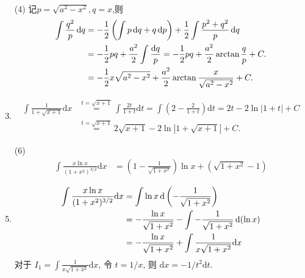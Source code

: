 \begin{solution}
\begin{enumerate}
\begin{align*}
              \end{align*}
        \item[(4)] 记$p = \sqrt{a^2 - x^2}, q = x$,则
            \begin{align*}
                \int \frac{q^2}{p} \operatorname{d\!} q & = -\frac{1}{2} \left( \int p \operatorname{d\!} q + q \operatorname{d\!} p \right) + \frac{1}{2} \int \frac{p^2 + q^2}{p} \operatorname{d\!} q               \\
                                          & = -\frac{1}{2} pq + \frac{a^2}{2} \int \frac{\operatorname{d\!} q}{p} = -\frac{1}{2} pq + \frac{a^2}{2} \arctan \frac{q}{p} + C. \\
                                          & = -\frac{1}{2} x \sqrt{a^2 - x^2} + \frac{a^2}{2} \arctan \frac{x}{\sqrt{a^2 - x^2}} + C.
            \end{align*}
        \item \begin{align*}
                  \int \frac{1}{1 + \sqrt{x+ 1} } \mathrm{d}x & \overset{t = \sqrt{x+1}}{=} \int \frac{2t}{1+t} \mathrm{d}t = \int \left(2 - \frac{2}{1+t}\right) \mathrm{d}t = 2t - 2 \ln |1+t| + C \\
                                                              & \overset{t = \sqrt{x+1}}{=} 2\sqrt{x+1} - 2 \ln |1 + \sqrt{x+1}| + C.
              \end{align*}
        \item[(6)] \begin{align*}
                \int \frac{x \ln x}{(1 + x^2)^{3/2}} \mathrm{d}x & = \left( 1 - \frac{1}{\sqrt{1 + x^2}} \right) \ln x + \left( \sqrt{1 + x^2} - 1 \right)
            \end{align*}
        \item %
              \begin{align*}
                  \int \frac{x \ln x}{(1 + x^2)^{3/2}} \mathrm{d}x & = \int \ln x \operatorname{d}\left(-\frac{1}{\sqrt{1 + x^2}}\right)                      \\
                                                                   & = -\frac{\ln x}{\sqrt{1 + x^2}} - \int -\frac{1}{\sqrt{1 + x^2}} \operatorname{d}(\ln x) \\
                                                                   & = -\frac{\ln x}{\sqrt{1 + x^2}} + \int \frac{1}{x \sqrt{1 + x^2}} \mathrm{d}x
              \end{align*}
              对于 $I_1 = \int \frac{1}{x \sqrt{1 + x^2}} \mathrm{d}x$, 令 $t = 1/x$, 则 $\mathrm{d}x = -1/t^2 \mathrm{d}t$.
              \begin{align*}

\end{align*}
\end{enumerate}
\end{solution}
